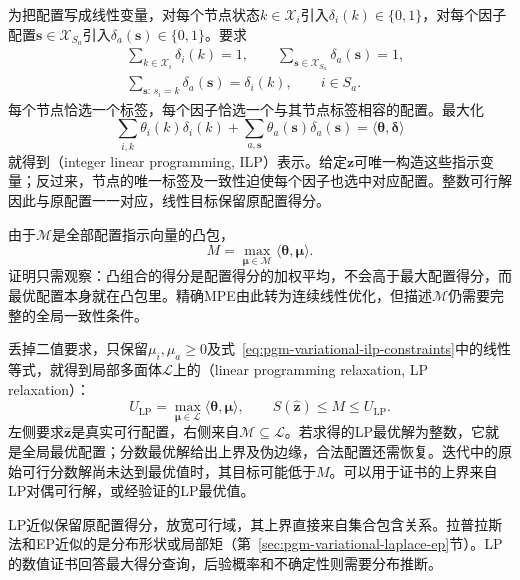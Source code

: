为把配置写成线性变量，对每个节点状态$k\in\mathcal X_i$引入$\delta_i(k)\in\{0,1\}$，对每个因子配置$\bm s\in\mathcal X_{S_a}$引入$\delta_a(\bm s)\in\{0,1\}$。要求
\begin{equation}
  \begin{aligned}
    &\sum_{k\in\mathcal X_i}\delta_i(k)=1,\qquad
       \sum_{\bm s\in\mathcal X_{S_a}}\delta_a(\bm s)=1,\\
    &\sum_{\bm s:\,s_i=k}\delta_a(\bm s)=\delta_i(k),
        \qquad i\in S_a.
  \end{aligned}
  \label{eq:pgm-variational-ilp-constraints}
\end{equation}
每个节点恰选一个标签，每个因子恰选一个与其节点标签相容的配置。最大化
\[
  \sum_{i,k}\theta_i(k)\delta_i(k)
     +\sum_{a,\bm s}\theta_a(\bm s)\delta_a(\bm s)
     =\langle\bm{\theta},\bm{\delta}\rangle
\]
就得到（integer linear programming, ILP）表示。给定$\bm z$可唯一构造这些指示变量；反过来，节点的唯一标签及一致性迫使每个因子也选中对应配置。整数可行解因此与原配置一一对应，线性目标保留原配置得分。

由于$\mathcal M$是全部配置指示向量的凸包，
\begin{equation}
  M=\max_{\bm{\mu}\in\mathcal M}
          \langle\bm{\theta},\bm{\mu}\rangle.
  \label{eq:pgm-variational-mpe-marginal}
\end{equation}
证明只需观察：凸组合的得分是配置得分的加权平均，不会高于最大配置得分，而最优配置本身就在凸包里。精确MPE由此转为连续线性优化，但描述$\mathcal M$仍需要完整的全局一致性条件。

丢掉二值要求，只保留$\mu_i,\mu_a\geq0$及式~\eqref{eq:pgm-variational-ilp-constraints}中的线性等式，就得到局部多面体$\mathcal L$上的（linear programming relaxation, LP relaxation）：
\begin{equation}
  U_{\mathrm{LP}}
     =\max_{\bm{\mu}\in\mathcal L}
               \langle\bm{\theta},\bm{\mu}\rangle,
  \qquad
  S(\widehat{\bm z})\leq M\leq U_{\mathrm{LP}}.
  \label{eq:pgm-variational-lp-bound}
\end{equation}
左侧要求$\widehat{\bm z}$是真实可行配置，右侧来自$\mathcal M\subseteq\mathcal L$。若求得的LP最优解为整数，它就是全局最优配置；分数最优解给出上界及伪边缘，合法配置还需恢复。迭代中的原始可行分数解尚未达到最优值时，其目标可能低于$M$。可以用于证书的上界来自LP对偶可行解，或经验证的LP最优值。

LP近似保留原配置得分，放宽可行域，其上界直接来自集合包含关系。拉普拉斯法和EP近似的是分布形状或局部矩（第~\ref{sec:pgm-variational-laplace-ep}节）。LP的数值证书回答最大得分查询，后验概率和不确定性则需要分布推断。

